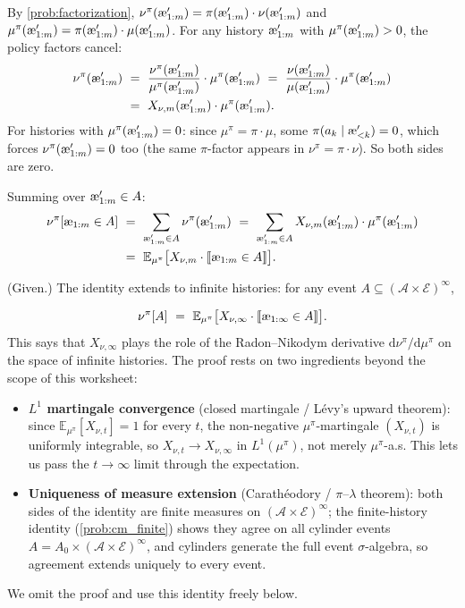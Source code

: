 \documentclass[fontsize=11pt, parskip=half]{scrartcl}
\newcommand{\cA}{\mathcal{A}}
\newcommand{\cE}{\mathcal{E}}
\newcommand{\Ex}{\mathbb{E}}
\newcommand{\aes}{\textnormal{\ae}}
\begin{document}
\begin{solution}
By \cref{prob:factorization}, $\nu^\pi(\aes'_{1:m}) = \pi(\aes'_{1:m}) \cdot \nu(\aes'_{1:m})$ and $\mu^\pi(\aes'_{1:m}) = \pi(\aes'_{1:m}) \cdot \mu(\aes'_{1:m})$.
For any history $\aes'_{1:m}$ with $\mu^\pi(\aes'_{1:m}) > 0$, the policy factors cancel:
\begin{align*}
    \nu^\pi(\aes'_{1:m})
    ~&=~ \frac{\nu^\pi(\aes'_{1:m})}{\mu^\pi(\aes'_{1:m})} \cdot \mu^\pi(\aes'_{1:m})
    ~=~ \frac{\nu(\aes'_{1:m})}{\mu(\aes'_{1:m})} \cdot \mu^\pi(\aes'_{1:m}) \\
    ~&=~ X_{\nu,m}(\aes'_{1:m}) \cdot \mu^\pi(\aes'_{1:m}).
\end{align*}
For histories with $\mu^\pi(\aes'_{1:m}) = 0$: since $\mu^\pi = \pi \cdot \mu$, some $\pi(a_k \mid \aes'_{<k}) = 0$, which forces $\nu^\pi(\aes'_{1:m}) = 0$ too (the same $\pi$-factor appears in $\nu^\pi = \pi \cdot \nu$). So both sides are zero.

Summing over $\aes'_{1:m} \in A$:
\begin{align*}
    \nu^\pi[\aes_{1:m} \in A]
    ~&=~ \sum_{\aes'_{1:m} \in A} \nu^\pi(\aes'_{1:m})
    ~=~ \sum_{\aes'_{1:m} \in A} X_{\nu,m}(\aes'_{1:m}) \cdot \mu^\pi(\aes'_{1:m}) \\
    ~&=~ \Ex_{\mu^\pi}\big[X_{\nu,m} \cdot \llbracket \aes_{1:m} \in A \rrbracket\big].
\end{align*}
\end{solution}

\begin{exercise}
\label{prob:cm_extension}
\textup{(Given.)} The identity extends to infinite histories: for any event $A \subseteq (\cA \times \cE)^\infty$,

\[
    \nu^\pi[A] ~=~ \Ex_{\mu^\pi}\big[X_{\nu,\infty} \cdot \llbracket \aes_{1:\infty} \in A \rrbracket\big].
\]
This says that $X_{\nu,\infty}$ plays the role of the Radon--Nikodym derivative $\mathrm{d}\nu^\pi/\mathrm{d}\mu^\pi$ on the space of infinite histories. The proof rests on two ingredients beyond the scope of this worksheet:
\begin{itemize}
    \item \textbf{$L^1$ martingale convergence} (closed martingale / L\'evy's upward theorem): since $\Ex_{\mu^\pi}[X_{\nu,t}] = 1$ for every $t$, the non-negative $\mu^\pi$-martingale $(X_{\nu,t})$ is uniformly integrable, so $X_{\nu,t} \to X_{\nu,\infty}$ in $L^1(\mu^\pi)$, not merely $\mu^\pi$-a.s. This lets us pass the $t\to\infty$ limit through the expectation.
    \item \textbf{Uniqueness of measure extension} (Carath\'eodory / $\pi$--$\lambda$ theorem): both sides of the identity are finite measures on $(\cA\times\cE)^\infty$; the finite-history identity (\cref{prob:cm_finite}) shows they agree on all cylinder events $A = A_0 \times (\cA\times\cE)^\infty$, and cylinders generate the full event $\sigma$-algebra, so agreement extends uniquely to every event.
\end{itemize}
We omit the proof and use this identity freely below.
\end{exercise}
\end{document}
